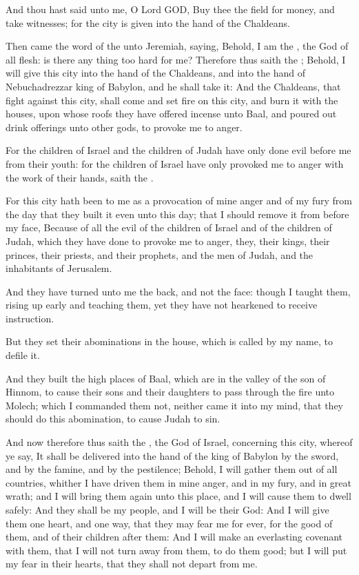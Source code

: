 \verse And thou hast said unto me, O Lord GOD, Buy thee the field for money, and take witnesses; for the city is given into the hand of the Chaldeans.

\verse Then came the word of the \LORD unto Jeremiah, saying, \verse Behold, I am the \LORD, the God of all flesh: is there any thing too hard for me?  \verse Therefore thus saith the \LORD; Behold, I will give this city into the hand of the Chaldeans, and into the hand of Nebuchadrezzar king of Babylon, and he shall take it: \verse And the Chaldeans, that fight against this city, shall come and set fire on this city, and burn it with the houses, upon whose roofs they have offered incense unto Baal, and poured out drink offerings unto other gods, to provoke me to anger.

\verse For the children of Israel and the children of Judah have only done evil before me from their youth: for the children of Israel have only provoked me to anger with the work of their hands, saith the \LORD.

\verse For this city hath been to me as a provocation of mine anger and of my fury from the day that they built it even unto this day; that I should remove it from before my face, \verse Because of all the evil of the children of Israel and of the children of Judah, which they have done to provoke me to anger, they, their kings, their princes, their priests, and their prophets, and the men of Judah, and the inhabitants of Jerusalem.

\verse And they have turned unto me the back, and not the face: though I taught them, rising up early and teaching them, yet they have not hearkened to receive instruction.

\verse But they set their abominations in the house, which is called by my name, to defile it.

\verse And they built the high places of Baal, which are in the valley of the son of Hinnom, to cause their sons and their daughters to pass through the fire unto Molech; which I commanded them not, neither came it into my mind, that they should do this abomination, to cause Judah to sin.

\verse And now therefore thus saith the \LORD, the God of Israel, concerning this city, whereof ye say, It shall be delivered into the hand of the king of Babylon by the sword, and by the famine, and by the pestilence; \verse Behold, I will gather them out of all countries, whither I have driven them in mine anger, and in my fury, and in great wrath; and I will bring them again unto this place, and I will cause them to dwell safely: \verse And they shall be my people, and I will be their God: \verse And I will give them one heart, and one way, that they may fear me for ever, for the good of them, and of their children after them: \verse And I will make an everlasting covenant with them, that I will not turn away from them, to do them good; but I will put my fear in their hearts, that they shall not depart from me.

